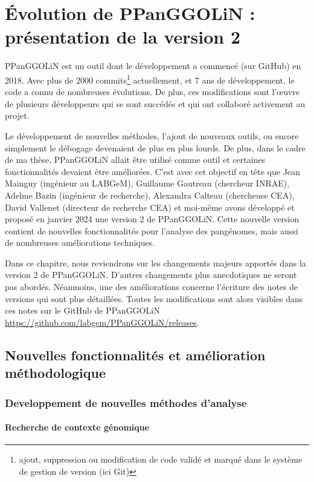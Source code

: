 \chapter{Évolution de PPanGGOLiN : présentation de la version 2}

PPanGGOLiN est un outil dont le développement a commencé (sur GitHub) en 2018. Avec plus de 2000 commits\footnote{ajout, suppression ou modification de code validé et marqué dans le système de gestion de version (ici Git)} actuellement, et 7 ans de développement, le code a connu de nombreuses évolutions. De plus, ces modifications sont l'\oe uvre de plusieurs développeurs qui se sont succédés et qui ont collaboré activement au projet.

Le développement de nouvelles méthodes, l'ajout de nouveaux outils, ou encore simplement le débogage devenaient de plus en plus lourds. De plus, dans le cadre de ma thèse, PPanGGOLiN allait être utilisé comme outil et certaines fonctionnalités devaient être améliorées. C'est avec cet objectif en tête que Jean Mainguy (ingénieur au LABGeM), Guillaume Gautreau (chercheur INRAE), Adelme Bazin (ingénieur de recherche), Alexandra Calteau (chercheuse CEA), David Vallenet (directeur de recherche CEA) et moi-même avons développé et proposé en janvier 2024 une version 2 de PPanGGOLiN. Cette nouvelle version contient de nouvelles fonctionnalités pour l'analyse des pangénomes, mais aussi de nombreuses améliorations techniques.

Dans ce chapitre, nous reviendrons sur les changements majeurs apportés dans la version 2 de PPanGGOLiN. D'autres changements plus anecdotiques ne seront pas abordés. Néanmoins, une des améliorations concerne l'écriture des notes de versions qui sont plus détaillées. Toutes les modifications sont alors visibles dans ces notes sur le GitHub de PPanGGOLiN \url{https://github.com/labgem/PPanGGOLiN/releases}.

\section{Nouvelles fonctionnalités et amélioration méthodologique}
\subsection{Developpement de nouvelles méthodes d’analyse}
\subsubsection{Recherche de contexte génomique}


